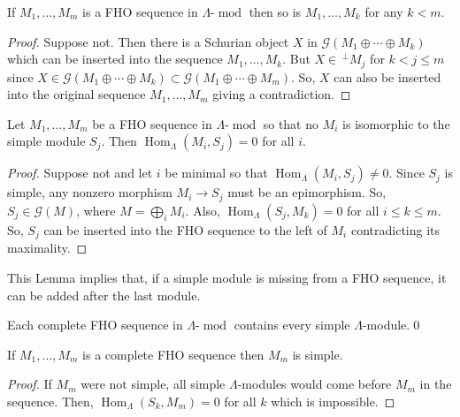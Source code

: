 \documentclass[ALCO,ThmDefs,Unicode,epreuves]{cedram}
\DeclareMathOperator{\Hom}{Hom}%
\DeclareMathOperator{\modr}{mod}
\newcommand{\cG}{\ensuremath{{\mathcal{G}}}}
\begin{document}
\begin{prop}\label{prop:subsequence of hom orth is hom orth}
If $M_1,\ldots,M_m$ is a FHO sequence in $\Lambda\text{-}\modr $ then so is $M_1,\ldots,M_k$ for any $k<m$.
\end{prop}

\begin{proof}
Suppose not. Then there is a Schurian object $X$ in $\cG(M_1\oplus \cdots\oplus M_k)$ which can be inserted into the sequence $M_1,\ldots,M_k$. But $X\in \,^\perp M_j$ for $k<j\le m$ since $X\in \cG(M_1\oplus\cdots\oplus M_k)\subset \cG(M_1\oplus\cdots\oplus M_m)$. So, $X$ can also be inserted into the original sequence $M_1,\ldots,M_m$ giving a contradiction.
\end{proof}

\begin{lemm}\label{lem:when Sk is not one of the Mi}
Let $M_1,\ldots,M_m$ be a FHO sequence in $\Lambda\text{-}\modr $ so that no $M_i$ is isomorphic to the simple module $S_j$. Then $\Hom_\Lambda(M_i,S_j)=0$ for all $i$.
\end{lemm}

\begin{proof}
Suppose not and let $i$ be minimal so that $\Hom_\Lambda(M_i,S_j)\neq0$. Since $S_j$ is simple, any nonzero morphism $M_i\to S_j$ must be an epimorphism. So, $S_j\in\cG(M)$, where $M=\bigoplus_iM_i$. Also, $\Hom_\Lambda(S_j,M_k)=0$ for all $i\le k\le m$. So, $S_j$ can be inserted into the FHO sequence to the left of $M_i$ contradicting its maximality.
\end{proof}

This Lemma implies that, if a simple module is missing from a FHO sequence, it can be added after the last module.

\begin{prop}
Each complete FHO sequence in $\Lambda\text{-}\modr $ contains every simple $\Lambda$-module.\qed
\end{prop}

\begin{coro}\label{cor: every comple fhos ends in a simple}
If $M_1,\ldots,M_m$ is a complete FHO sequence then $M_m$ is simple.
\end{coro}

\begin{proof}
If $M_m$ were not simple, all simple $\Lambda$-modules would come before $M_m$ in the sequence. Then, $\Hom_\Lambda(S_k,M_m)=0$ for all $k$ which is impossible.
\end{proof}
\end{document}
